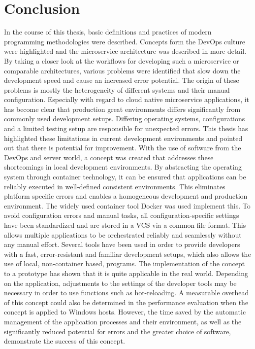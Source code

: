 
\section{Conclusion}\label{sec::conclusion}
In the course of this thesis, basic definitions and practices of modern programming methodologies were described. Concepts form the DevOps culture were highlighted and the microservice architecture was described in more detail. By taking a closer look at the workflows for developing such a microservice or comparable architectures, various problems were identified that slow down the development speed and cause an increased error potential. The origin of these problems is mostly the heterogeneity of different systems and their manual configuration. Especially with regard to cloud native microservice applications, it has become clear that production great environments differs significantly from commonly used development setups. Differing operating systems, configurations and a limited testing setup are responsible for unexpected errors.\newline
This thesis has highlighted these limitations in current development environments and pointed out that there is potential for improvement. With the use of software from the DevOps and server world, a concept was created that addresses these shortcomings in local development environments. By abstracting the operating system through container technology, it can be ensured that applications can be reliably executed in well-defined consistent environments. This eliminates platform specific errors and enables a homogeneous development and production environment. The widely used container tool Docker was used implement this. To avoid configuration errors and manual tasks, all configuration-specific settings have been standardized and are stored in a \ac{VCS} via a common file format. This allows multiple applications to be orchestrated reliably and seamlessly without any manual effort. Several tools have been used in order to provide developers with a fast, error-resistant and familiar development setups, which also allows the use of local, non-container based, programs.\newline
The implementation of the concept to a prototype has shown that it is quite applicable in the real world. Depending on the application, adjustments to the settings of the developer tools may be necessary in order to use functions such as hot-reloading. A measurable overhead of this concept could also be determined in the performance evaluation when the concept is applied to Windows hosts. However, the time saved by the automatic management of the application processes and their environment, as well as the significantly reduced potential for errors and the greater choice of software, demonstrate the success of this concept.\newline
